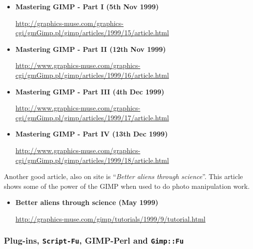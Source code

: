 \documentclass[twoside,11pt]{starlink}
\begin{document}
\begin{itemize}
\item \textbf{Mastering GIMP - Part I (5th Nov 1999)}\\
\begin{small}\url{http://graphics-muse.com/graphics-cgi/gmGimp.pl/gimp/articles/1999/15/article.html}\end{small}

\item \textbf{Mastering GIMP - Part II (12th Nov 1999)}\\
\begin{small}\url{http://www.graphics-muse.com/graphics-cgi/gmGimp.pl/gimp/articles/1999/16/article.html}\end{small}

\item \textbf{Mastering GIMP - Part III (4th Dec 1999)}\\
\begin{small}\url{http://www.graphics-muse.com/graphics-cgi/gmGimp.pl/gimp/articles/1999/17/article.html}\end{small}

\item \textbf{Mastering GIMP - Part IV (13th Dec 1999)}\\
\begin{small}\url{http://www.graphics-muse.com/graphics-cgi/gmGimp.pl/gimp/articles/1999/18/article.html}\end{small}
\end{itemize}

Another good article, also on  site is ``\emph{Better aliens through science}''. This article  shows some of the power of the GIMP when used to do photo manipulation work.

\begin{itemize}
\item \textbf{Better aliens through science (May 1999)}\\
\begin{small}\url{http://graphics-muse.com/gimp/tutorials/1999/9/tutorial.html}\end{small}
\end{itemize}

\subsubsection{Plug-ins, \texttt{Script-Fu}, GIMP-Perl and \texttt{Gimp::Fu}}
\end{document}
